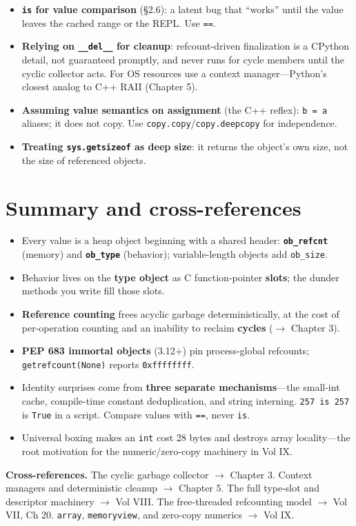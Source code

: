 \begin{itemize}
  \item \textbf{\texttt{is} for value comparison} (§2.6): a latent bug that ``works'' until
    the value leaves the cached range or the REPL. Use \texttt{==}.
  \item \textbf{Relying on \texttt{\_\_del\_\_} for cleanup}: refcount-driven finalization is
    a CPython detail, not guaranteed promptly, and never runs for cycle members until the
    cyclic collector acts. For OS resources use a context manager---Python's closest analog
    to C++ RAII (Chapter 5).
  \item \textbf{Assuming value semantics on assignment} (the C++ reflex): \texttt{b = a}
    aliases; it does not copy. Use \texttt{copy.copy}/\texttt{copy.deepcopy} for
    independence.
  \item \textbf{Treating \texttt{sys.getsizeof} as deep size}: it returns the object's own
    size, not the size of referenced objects.
\end{itemize}

\section{Summary and cross-references}

\begin{itemize}
  \item Every value is a heap object beginning with a shared header: \textbf{\texttt{ob\_refcnt}}
    (memory) and \textbf{\texttt{ob\_type}} (behavior); variable-length objects add
    \texttt{ob\_size}.
  \item Behavior lives on the \textbf{type object} as C function-pointer \textbf{slots}; the
    dunder methods you write fill those slots.
  \item \textbf{Reference counting} frees acyclic garbage deterministically, at the cost of
    per-operation counting and an inability to reclaim \textbf{cycles} ($\rightarrow$
    Chapter 3).
  \item \textbf{PEP 683 immortal objects} (3.12+) pin process-global refcounts;
    \texttt{getrefcount(None)} reports \texttt{0xffffffff}.
  \item Identity surprises come from \textbf{three separate mechanisms}---the small-int
    cache, compile-time constant deduplication, and string interning. \texttt{257 is 257} is
    \texttt{True} in a script. Compare values with \texttt{==}, never \texttt{is}.
  \item Universal boxing makes an \texttt{int} cost 28 bytes and destroys array locality---the
    root motivation for the numeric/zero-copy machinery in Vol IX.
\end{itemize}

\textbf{Cross-references.} The cyclic garbage collector $\rightarrow$ Chapter 3. Context
managers and deterministic cleanup $\rightarrow$ Chapter 5. The full type-slot and descriptor
machinery $\rightarrow$ Vol VIII. The free-threaded refcounting model $\rightarrow$ Vol VII,
Ch 20. \texttt{array}, \texttt{memoryview}, and zero-copy numerics $\rightarrow$ Vol IX.
